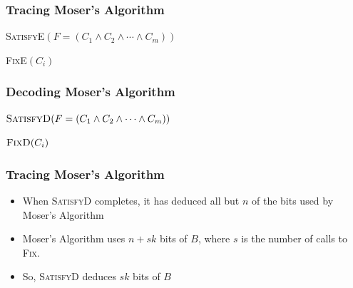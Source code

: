 \documentclass{beamer}
\begin{document}
\frame
{
  \frametitle{Tracing Moser's Algorithm}

  \noindent\textsc{SatisfyE$(F=(C_1\wedge C_2\wedge\cdots\wedge C_m))$}
  \begin{algorithmic}
     \ENDIF
   \ENDFOR
  \end{algorithmic}
  \vspace{1ex}
  \noindent\textsc{FixE$(C_i)$}
  \begin{algorithmic}
     \ENDIF
   \ENDFOR
  \end{algorithmic}
}


\frame
{
  \frametitle{Decoding Moser's Algorithm}

  \noindent$\textsc{SatisfyD}(F=(C_1\wedge C_2\wedge\cdots\wedge C_m))$
  \begin{algorithmic}
   \ENDWHILE
  \end{algorithmic}
  \vspace{1ex}
  \noindent$\textsc{FixD}(C_i)$
  \begin{algorithmic}
   \ENDWHILE 
  \end{algorithmic}
}


\frame
{
  \frametitle{Tracing Moser's Algorithm}

  \begin{itemize}
    \item When \textsc{SatisfyD} completes, it has deduced all but 
          $n$ of the bits used by Moser's Algorithm
    \item Moser's Algorithm uses $n + sk$ bits of $B$, where $s$ is the
          number of calls to \textsc{Fix}.
    \item So, \textsc{SatisfyD} deduces $sk$ bits of $B$
  \end{itemize}
}
\end{document}
